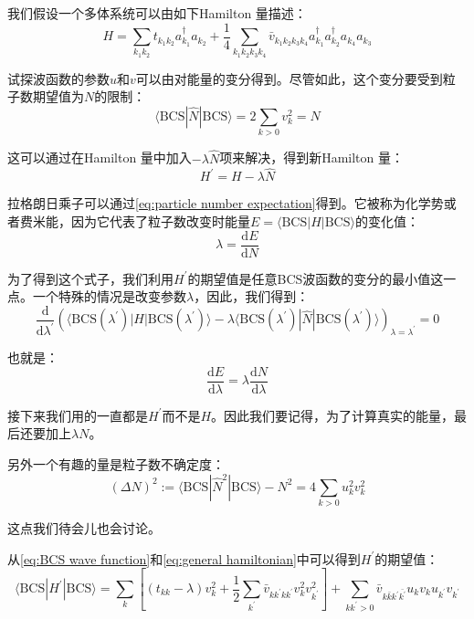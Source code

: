 我们假设一个多体系统可以由如下Hamilton 量描述：
\begin{equation}
H=\sum_{k_{1}k_{2}}t_{k_{1}k_{2}}a^{\dagger}_{k_{1}}a_{k_{2}}+\frac{1}{4}\sum_{k_{1}k_{2}k_{3}k_{4}}\bar{v}_{k_{1}k_{2}k_{3}k_{4}}a^{\dagger}_{k_{1}}a^{\dagger}_{k_{2}}a_{k_{4}}a_{k_{3}}\label{eq:general hamiltonian}
\end{equation}

试探波函数的参数$u$和$v$可以由对能量的变分得到。尽管如此，这个变分要受到粒子数期望值为$N$的限制：
\begin{equation}
\langle\text{BCS}|\hat{N}|\text{BCS}\rangle=2\sum_{k>0}v^{2}_{k}=N\label{eq:particle number expectation}
\end{equation}

这可以通过在Hamilton 量中加入$-\lambda\hat{N}$项来解决，得到新Hamilton 量：
\[
H^{\prime}=H-\lambda\hat{N}
\]

拉格朗日乘子可以通过\ref{eq:particle number expectation}得到。它被称为化学势或者费米能，因为它代表了粒子数改变时能量$E=\langle\text{BCS}|H|\text{BCS}\rangle$的变化值：
\[
\lambda=\frac{\mathrm{d}E}{\mathrm{d}N}
\]

为了得到这个式子，我们利用$H^{\prime}$的期望值是任意BCS波函数的变分的最小值这一点。一个特殊的情况是改变参数$\lambda$，因此，我们得到：
\[
\frac{\mathrm{d}}{\mathrm{d}\lambda^{\prime}}\left(\langle\text{BCS}(\lambda^{\prime})|H|\text{BCS}(\lambda^{\prime})\rangle-\lambda\langle\text{BCS}(\lambda^{\prime})|\hat{N}|\text{BCS}(\lambda^{\prime})\rangle\right)_{\lambda=\lambda^{\prime}}=0
\]

也就是：
\[
\frac{\mathrm{d}E}{\mathrm{d}\lambda}=\lambda\frac{\mathrm{d}N}{\mathrm{d}\lambda}
\]

接下来我们用的一直都是$H^{\prime}$而不是$H$。因此我们要记得，为了计算真实的能量，最后还要加上$\lambda N$。

另外一个有趣的量是粒子数不确定度：
\begin{equation}
(\Delta N)^{2}:=\langle\text{BCS}|\hat{N}^{2}|\text{BCS}\rangle-N^{2}=4\sum_{k>0}u^{2}_{k}v^{2}_{k}\label{eq:uncertainty of particle number}
\end{equation}

这点我们待会儿也会讨论。

从\ref{eq:BCS wave function}和\ref{eq:general hamiltonian}中可以得到$H^{\prime}$的期望值：
\[
\langle\text{BCS}|H^{\prime}|\text{BCS}\rangle=\sum_{k}\left[(t_{kk}-\lambda)v^{2}_{k}+\frac{1}{2}\sum_{k^{\prime}}\bar{v}_{kk^{\prime}kk^{\prime}}v^{2}_{k}v^{2}_{k^{\prime}}\right]+\sum_{kk^{\prime}>0}\bar{v}_{k\bar{k}k^{\prime}\bar{k^{\prime}}}u_{k}v_{k}u_{k^{\prime}}v_{k^{\prime}}
\]

